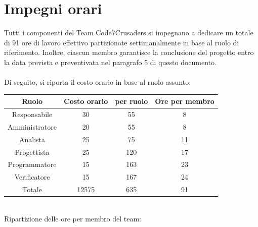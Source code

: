 \documentclass{article}
\begin{document}
\section{Impegni orari}
\label{sec:introduzione}
Tutti i componenti del Team Code7Crusaders si impegnano a dedicare un totale di 91 ore di lavoro effettivo partizionate 
settimanalmente in base al ruolo di riferimento. Inoltre, ciascun membro garantisce la conclusione del progetto entro la 
data prevista e preventivata nel paragrafo 5 di questo documento.
\\
\\
Di seguito, si riporta il costo orario in base al ruolo assunto:
\begin{table}[!h]
	\begin{center}
		\begin{tabular}{ |c|c|c|c| }
			\hline
			Ruolo          & Costo orario &  per ruolo & Ore per membro \\
			\hline
			Responsabile   & 30           &     55       &       8        \\
			Amministratore & 20           &     55       &       8        \\
			Analista       & 25           &     75       &       11       \\
			Progettista    & 25           &     120      &       17       \\
			Programmatore  & 15           &     163      &       23       \\
			Verificatore   & 15           &     167      &       24       \\
			\hline
			Totale         &    12575    &     635       &       91       \\
			\hline
		\end{tabular}
	\end{center}
\end{table}
\\
Ripartizione delle ore per membro del team:
\end{document}
